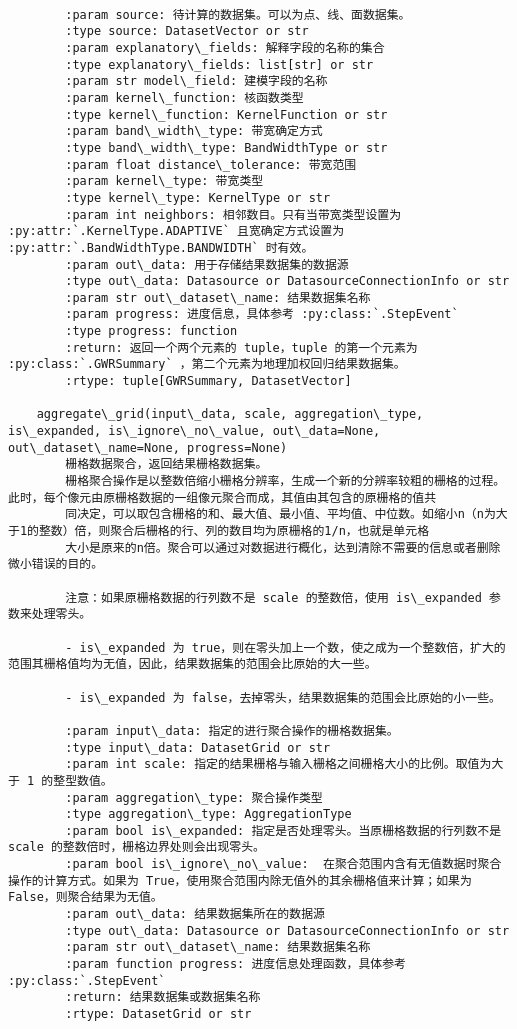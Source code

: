\documentclass[11pt]{article}
\begin{document}
\begin{Verbatim}[commandchars=\\\{\}]
        
        :param source: 待计算的数据集。可以为点、线、面数据集。
        :type source: DatasetVector or str
        :param explanatory\_fields: 解释字段的名称的集合
        :type explanatory\_fields: list[str] or str
        :param str model\_field: 建模字段的名称
        :param kernel\_function: 核函数类型
        :type kernel\_function: KernelFunction or str
        :param band\_width\_type: 带宽确定方式
        :type band\_width\_type: BandWidthType or str
        :param float distance\_tolerance: 带宽范围
        :param kernel\_type: 带宽类型
        :type kernel\_type: KernelType or str
        :param int neighbors: 相邻数目。只有当带宽类型设置为 :py:attr:`.KernelType.ADAPTIVE` 且宽确定方式设置为 :py:attr:`.BandWidthType.BANDWIDTH` 时有效。
        :param out\_data: 用于存储结果数据集的数据源
        :type out\_data: Datasource or DatasourceConnectionInfo or str
        :param str out\_dataset\_name: 结果数据集名称
        :param progress: 进度信息，具体参考 :py:class:`.StepEvent`
        :type progress: function
        :return: 返回一个两个元素的 tuple，tuple 的第一个元素为 :py:class:`.GWRSummary` ，第二个元素为地理加权回归结果数据集。
        :rtype: tuple[GWRSummary, DatasetVector]
    
    aggregate\_grid(input\_data, scale, aggregation\_type, is\_expanded, is\_ignore\_no\_value, out\_data=None, out\_dataset\_name=None, progress=None)
        栅格数据聚合，返回结果栅格数据集。
        栅格聚合操作是以整数倍缩小栅格分辨率，生成一个新的分辨率较粗的栅格的过程。此时，每个像元由原栅格数据的一组像元聚合而成，其值由其包含的原栅格的值共
        同决定，可以取包含栅格的和、最大值、最小值、平均值、中位数。如缩小n（n为大于1的整数）倍，则聚合后栅格的行、列的数目均为原栅格的1/n，也就是单元格
        大小是原来的n倍。聚合可以通过对数据进行概化，达到清除不需要的信息或者删除微小错误的目的。
        
        注意：如果原栅格数据的行列数不是 scale 的整数倍，使用 is\_expanded 参数来处理零头。
        
        - is\_expanded 为 true，则在零头加上一个数，使之成为一个整数倍，扩大的范围其栅格值均为无值，因此，结果数据集的范围会比原始的大一些。
        
        - is\_expanded 为 false，去掉零头，结果数据集的范围会比原始的小一些。
        
        :param input\_data: 指定的进行聚合操作的栅格数据集。
        :type input\_data: DatasetGrid or str
        :param int scale: 指定的结果栅格与输入栅格之间栅格大小的比例。取值为大于 1 的整型数值。
        :param aggregation\_type: 聚合操作类型
        :type aggregation\_type: AggregationType
        :param bool is\_expanded: 指定是否处理零头。当原栅格数据的行列数不是 scale 的整数倍时，栅格边界处则会出现零头。
        :param bool is\_ignore\_no\_value:  在聚合范围内含有无值数据时聚合操作的计算方式。如果为 True，使用聚合范围内除无值外的其余栅格值来计算；如果为 False，则聚合结果为无值。
        :param out\_data: 结果数据集所在的数据源
        :type out\_data: Datasource or DatasourceConnectionInfo or str
        :param str out\_dataset\_name: 结果数据集名称
        :param function progress: 进度信息处理函数，具体参考 :py:class:`.StepEvent`
        :return: 结果数据集或数据集名称
        :rtype: DatasetGrid or str
    

\end{Verbatim}
\end{document}
